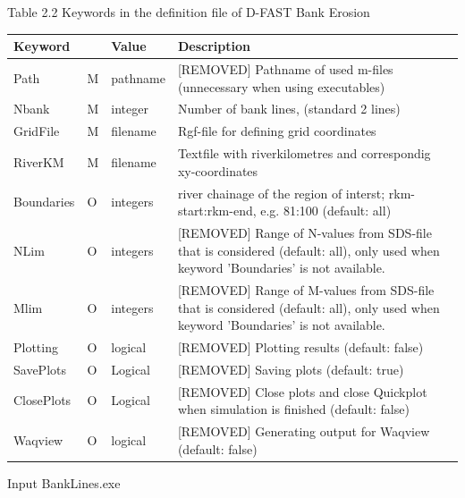 Table 2.2  Keywords in the definition file of D-FAST Bank Erosion

\begin{tabular}{lllp{5cm}}
Keyword &  & Value & Description \\ \hline
Path & M & pathname & [REMOVED] Pathname of used m-files (unnecessary when using executables) \\
Nbank & M & integer & Number of bank lines, (standard 2 lines) \\
GridFile  & M & filename & Rgf-file for defining grid coordinates \\
RiverKM & M & filename & Textfile with riverkilometres and correspondig xy-coordinates \\
Boundaries  & O & integers & river chainage of the region of interst;  rkm-start:rkm-end, e.g. 81:100 (default: all) \\
NLim & O & integers & [REMOVED] Range of N-values from SDS-file that is considered (default: all), only used when keyword 'Boundaries' is not available. \\
Mlim & O & integers & [REMOVED] Range of M-values from SDS-file that is considered (default: all), only used when keyword 'Boundaries' is not available. \\
Plotting & O & logical & [REMOVED] Plotting results (default: false) \\
SavePlots & O & Logical & [REMOVED] Saving plots (default: true) \\
ClosePlots & O & Logical & [REMOVED] Close plots and close Quickplot when simulation is finished (default: false) \\
Waqview & O & logical & [REMOVED] Generating output for Waqview (default: false) \\ \hline
\end{tabular}

Input BankLines.exe

